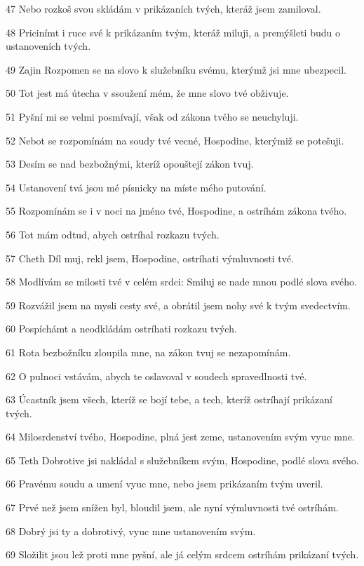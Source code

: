 \par 47 Nebo rozkoš svou skládám v prikázaních tvých, kteráž jsem zamiloval.
\par 48 Pricinímt i ruce své k prikázaním tvým, kteráž miluji, a premýšleti budu o ustanoveních tvých.
\par 49 Zajin Rozpomen se na slovo k služebníku svému, kterýmž jsi mne ubezpecil.
\par 50 Tot jest má útecha v ssoužení mém, že mne slovo tvé obživuje.
\par 51 Pyšní mi se velmi posmívají, však od zákona tvého se neuchyluji.
\par 52 Nebot se rozpomínám na soudy tvé vecné, Hospodine, kterýmiž se potešuji.
\par 53 Desím se nad bezbožnými, kteríž opouštejí zákon tvuj.
\par 54 Ustanovení tvá jsou mé písnicky na míste mého putování.
\par 55 Rozpomínám se i v noci na jméno tvé, Hospodine, a ostríhám zákona tvého.
\par 56 Tot mám odtud, abych ostríhal rozkazu tvých.
\par 57 Cheth Díl muj, rekl jsem, Hospodine, ostríhati výmluvnosti tvé.
\par 58 Modlívám se milosti tvé v celém srdci: Smiluj se nade mnou podlé slova svého.
\par 59 Rozvážil jsem na mysli cesty své, a obrátil jsem nohy své k tvým svedectvím.
\par 60 Pospíchámt a neodkládám ostríhati rozkazu tvých.
\par 61 Rota bezbožníku zloupila mne, na zákon tvuj se nezapomínám.
\par 62 O pulnoci vstávám, abych te oslavoval v soudech spravedlnosti tvé.
\par 63 Úcastník jsem všech, kteríž se bojí tebe, a tech, kteríž ostríhají prikázaní tvých.
\par 64 Milosrdenství tvého, Hospodine, plná jest zeme, ustanovením svým vyuc mne.
\par 65 Teth Dobrotive jsi nakládal s služebníkem svým, Hospodine, podlé slova svého.
\par 66 Pravému soudu a umení vyuc mne, nebo jsem prikázaním tvým uveril.
\par 67 Prvé než jsem snížen byl, bloudil jsem, ale nyní výmluvnosti tvé ostríhám.
\par 68 Dobrý jsi ty a dobrotivý, vyuc mne ustanovením svým.
\par 69 Složilit jsou lež proti mne pyšní, ale já celým srdcem ostríhám prikázaní tvých.
